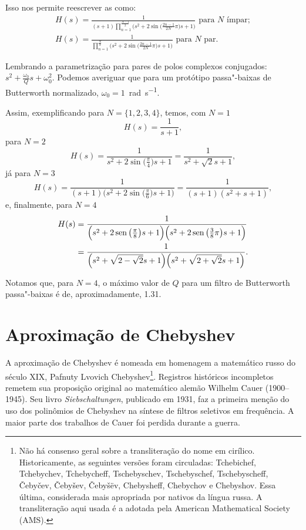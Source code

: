 Isso nos permite reescrever as  como:
\begin{gather}
	\boxed{H(s)=\frac{1}{\displaystyle(s+1)\prod_{n=1}^{\frac{N-1}{2}}\bigg(s^2+2\sin\Big(\frac{2n-1}{2N}\pi\Big)s+1\bigg)}\text{ para }N\text{ ímpar};}\\
	\boxed{H(s)=\frac{1}{\displaystyle\prod_{n=1}^{\frac{N}{2}}\bigg(s^2+2\sin\Big(\frac{2n-1}{2N}\pi\Big)s+1\bigg)}\text{ para }N\text{ par}.}
\end{gather}

Lembrando a parametrização para pares de polos complexos conjugados: $s^2+\frac{\omega_0}{Q}s+\omega_0^2$. Podemos averiguar que para um protótipo passa"-baixas de Butterworth normalizado, $\omega_0=1$~\unit{\radian\per\second}.

Assim, exemplificando para $N=\{1,2,3,4\}$, temos, com $N=1$
\begin{equation}
	H(s)=\frac{1}{s+1},
\end{equation}
para $N=2$
\begin{equation}
	H(s)=\frac{1}{s^2+2\sin\big(\frac{\pi}{4}\big)s+1}=\frac{1}{s^2+\sqrt{2}s+1},
\end{equation}
já para $N=3$
\begin{equation}
	H(s)=\frac{1}{(s+1)\Big(s^2+2\sin\big(\frac{\pi}{6}\big)s+1\Big)}=\frac{1}{(s+1)(s^2+s+1)},
\end{equation}
e, finalmente, para $N=4$
\begin{align}
	H(s)&=\frac{1}{\Big(s^2+2\sin\big(\frac{\pi}{8}\big)s+1\Big)\Big(s^2+2\sin\big(\frac{3}{8}\pi\big)s+1\Big)}\notag\\
		&=\frac{1}{\Big(s^2+\sqrt{2-\sqrt{2}}s+1\Big)\Big(s^2+\sqrt{2+\sqrt{2}}s+1\Big)}.
\end{align}

Notamos que, para $N=4$, o máximo valor de $Q$ para um filtro de Butterworth passa"-baixas é de, aproximadamente, \num{1.31}.

\section{Aproximação de Chebyshev}

A aproximação de Chebyshev é nomeada em homenagem a matemático russo do século XIX, Pafnuty Lvovich Chebyshev\footnote{Não há consenso geral sobre a transliteração do nome em cirílico. Historicamente, as seguintes versões foram circuladas: Tchebichef, Tchebychev, Tchebycheff, Tschebyschev, Tschebyschef, Tschebyscheff, Čebyčev, Čebyšev, Čebyšëv, Chebysheff, Chebychov e Chebyshov. Essa última, considerada mais apropriada por nativos da língua russa. A transliteração aqui usada é a adotada pela American Mathematical Society (AMS).}. Registros históricos incompletos remetem sua proposição original ao matemático alemão Wilhelm Cauer (1900--1945). Seu livro \emph{Siebschaltungen}, publicado em 1931, faz a primeira menção do uso dos polinômios de Chebyshev na síntese de filtros seletivos em frequência. A maior parte dos trabalhos de Cauer foi perdida durante a guerra.

